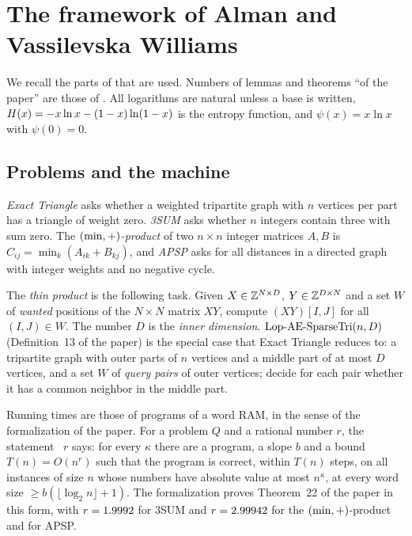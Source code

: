 \section{The framework of Alman and Vassilevska Williams}
\label{sec:framework}

We recall the parts of \cite{AV} that are used.  Numbers of lemmas and theorems
``of the paper'' are those of \cite{AV}.  All logarithms are natural unless a
base is written, \(H(x)=-x\ln x-(1-x)\ln(1-x)\) is the entropy function, and
\(\psi(x)=x\ln x\) with \(\psi(0)=0\).

\subsection{Problems and the machine}
\label{sec:machine}

\emph{Exact Triangle} asks whether a weighted tripartite graph with \(n\)
vertices per part has a triangle of weight zero.  \emph{3SUM} asks whether \(n\)
integers contain three with sum zero.  The \emph{\((\min,+)\)-product} of two
\(n\times n\) integer matrices \(A,B\) is \(C_{ij}=\min_k(A_{ik}+B_{kj})\), and
\emph{APSP} asks for all distances in a directed graph with integer weights and
no negative cycle.

The \emph{thin product} is the following task.  Given \(X\in\mathbb{Z}^{N\times D}\),
\(Y\in\mathbb{Z}^{D\times N}\) and a set \(W\) of \emph{wanted} positions of the
\(N\times N\) matrix \(XY\), compute \((XY)[I,J]\) for all \((I,J)\in W\).  The
number \(D\) is the \emph{inner dimension}.  \(\textup{Lop-AE-SparseTri}(n,D)\)
(Definition~13 of the paper) is the special case that Exact Triangle reduces
to: a tripartite graph with outer parts of \(n\) vertices and a middle part of
at most \(D\) vertices, and a set \(W\) of \emph{query pairs} of outer
vertices; decide for each pair whether it has a common neighbor in the middle
part.

Running times are those of programs of a word RAM, in the sense of the
formalization \cite{upstream} of the paper.  For a problem \(Q\) and a rational
number \(r\), the statement ~\(r\) says: for every \(\kappa\)
there are a program, a slope \(b\) and a bound \(T(n)=O(n^{r})\) such that the
program is correct, within \(T(n)\) steps, on all instances of size \(n\) whose
numbers have absolute value at most \(n^{\kappa}\), at every word size
\(\ge b(\lfloor\log_2 n\rfloor+1)\).  The formalization proves Theorem~22 of
the paper in this form, with \(r=1.9992\) for 3SUM and
\(r=2.99942\) for the \((\min,+)\)-product and for APSP.

